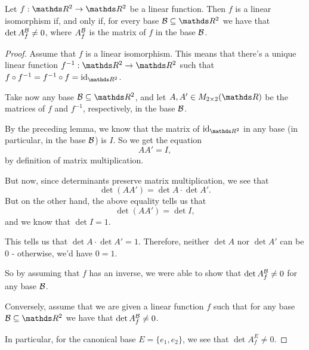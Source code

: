 \begin{theorem}
	Let $f:\R^2\to\R^2$ be a linear function. Then $f$ is a linear isomorphism if, and only if, for every base $\mc B\subseteq \R^2$ we have that $\det A_f^{\mathcal B}\neq0$, where $A_f^{\mathcal B}$ is the matrix of $f$ in the base $\mathcal B$.
\end{theorem}
\begin{proof}
	Assume that $f$ is a linear isomorphism. This means that there's a unique linear function $f^{-1}:\R^2\to \R^2$ such that $f\circ f^{-1}=f^{-1}\circ f=\id_{\R^2}$.
	
	Take now any base $\mc B\subseteq\R^2$, and let $A,A'\in M_{2\times 2}(\R)$ be the matrices of $f$ and $f^{-1}$, respectively, in the base $\mathcal B$.
	
	By the preceding lemma, we know that the matrix of $\id_{\R^2}$ in any base (in particular, in the base $\mathcal B$) is $I$. So we get the equation
	\[AA'=I,\]by definition of matrix multiplication.
	
	But now, since determinants preserve matrix multiplication, we see that
	\[\det(AA')=\det A\cdot \det A'.\] But on the other hand, the above equality tells us that
	\[\det(AA')=\det I,\]and we know that $\det I=1$.
	
	This tells us that $\det A\cdot \det A'=1$. Therefore, neither $\det A$ nor $\det A'$ can be 0 - otherwise, we'd have $0=1$.
	
	So by assuming that $f$ has an inverse, we were able to show that $\det A_f^{\mathcal B}\neq 0$ for any base $\mathcal B$.
	
	\bigskip
	Conversely, assume that we are given a linear function $f$ such that for any base $\mc B\subseteq \R^2$ we have that $\det A_f^{\mathcal B}\neq 0$.
	
	In particular, for the canonical base $E=\{e_1,e_2\}$, we see that $\det A_f^E\neq 0$.
\end{proof}